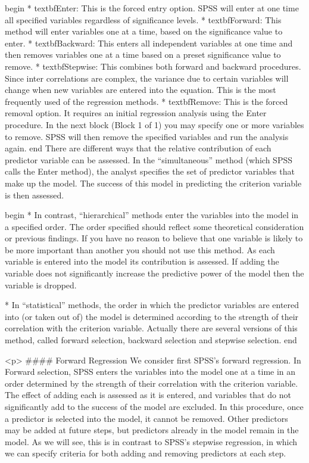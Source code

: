 begin{ }
         * textbf{Enter}: This is the forced entry option. SPSS will enter at one time all specified variables regardless of significance levels.
         * textbf{Forward}: This method will enter variables one at a time, based on the significance value to enter.
         * textbf{Backward}: This enters all independent variables at one time and then removes variables one at a time based on a preset significance value to remove.
         * textbf{Stepwise}: This combines both forward and backward procedures. Since inter correlations are complex, the variance due to certain variables will change when new variables are entered into the equation. This is the most frequently used of the regression methods.
         * textbf{Remove}: This is the forced removal option. It requires an initial regression analysis using the Enter procedure. In the next block (Block 1 of 1) you may specify one or more variables to remove. SPSS will then remove the specified variables and run the analysis again.
end{ }
There are different ways that the relative contribution of each predictor variable can be assessed. In the “simultaneous” method (which SPSS calls the Enter method), the analyst specifies the set of predictor variables that make up the model. The success of this model in predicting the criterion variable is then assessed.

begin{ }
	         * In contrast, “hierarchical” methods enter the variables into the model in a specified order. The order specified should reflect some theoretical consideration or previous
	findings. If you have no reason to believe that one variable is likely to be more important than another you should not use this method. As each variable is entered into the model its contribution is assessed. If adding the variable does not significantly increase the predictive power of the model then the variable is
	dropped.
	
         * In “statistical” methods, the order in which the predictor variables are entered into (or taken out of) the model is determined according to the strength of their correlation with the criterion variable. Actually there are several versions of this method, called forward selection, backward selection and stepwise selection.
end{ }


<p>
#### {Forward Regression}
We consider first SPSS’s forward regression. In Forward selection, SPSS enters the variables into the model one at a time in an
order determined by the strength of their correlation with the criterion variable. The effect of adding each is assessed as it is entered, and variables that do not significantly add to the success of the model are excluded. In this procedure, once a predictor is selected into the model, it cannot be removed. Other predictors may be added at future steps, but predictors already in the model remain in the model. As we will see, this is in contrast to SPSS’s stepwise regression, in which we can specify criteria for both adding and removing predictors at each step.

